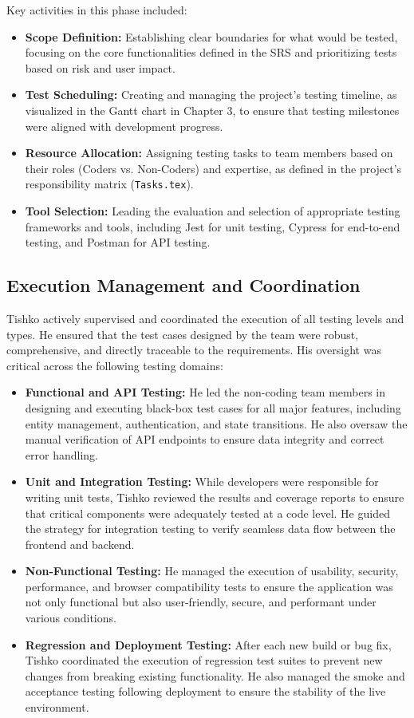 Key activities in this phase included:
\begin{itemize}
    \item \textbf{Scope Definition:} Establishing clear boundaries for what would be tested, focusing on the core functionalities defined in the SRS and prioritizing tests based on risk and user impact.
    \item \textbf{Test Scheduling:} Creating and managing the project's testing timeline, as visualized in the Gantt chart in Chapter 3, to ensure that testing milestones were aligned with development progress.
    \item \textbf{Resource Allocation:} Assigning testing tasks to team members based on their roles (Coders vs. Non-Coders) and expertise, as defined in the project's responsibility matrix (\texttt{Tasks.tex}).
    \item \textbf{Tool Selection:} Leading the evaluation and selection of appropriate testing frameworks and tools, including Jest for unit testing, Cypress for end-to-end testing, and Postman for API testing.
\end{itemize}

\subsection{Execution Management and Coordination}
Tishko actively supervised and coordinated the execution of all testing levels and types. He ensured that the test cases designed by the team were robust, comprehensive, and directly traceable to the requirements. His oversight was critical across the following testing domains:
\begin{itemize}
    \item \textbf{Functional and API Testing:} He led the non-coding team members in designing and executing black-box test cases for all major features, including entity management, authentication, and state transitions. He also oversaw the manual verification of API endpoints to ensure data integrity and correct error handling.
    \item \textbf{Unit and Integration Testing:} While developers were responsible for writing unit tests, Tishko reviewed the results and coverage reports to ensure that critical components were adequately tested at a code level. He guided the strategy for integration testing to verify seamless data flow between the frontend and backend.
    \item \textbf{Non-Functional Testing:} He managed the execution of usability, security, performance, and browser compatibility tests to ensure the application was not only functional but also user-friendly, secure, and performant under various conditions.
    \item \textbf{Regression and Deployment Testing:} After each new build or bug fix, Tishko coordinated the execution of regression test suites to prevent new changes from breaking existing functionality. He also managed the smoke and acceptance testing following deployment to ensure the stability of the live environment.
\end{itemize}

